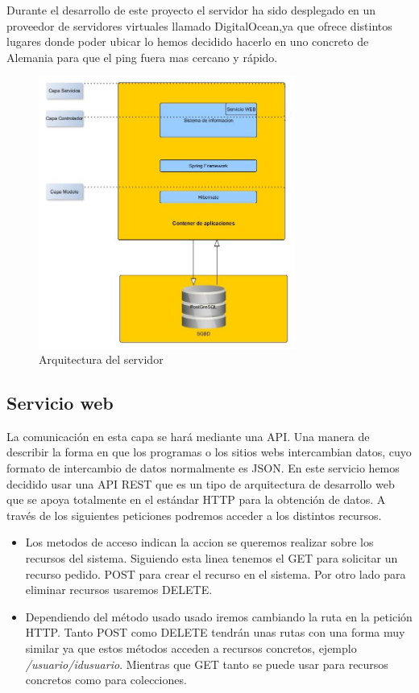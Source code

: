 Durante el desarrollo  de este proyecto el servidor ha sido desplegado en un proveedor de servidores virtuales llamado 
  DigitalOcean,ya que ofrece distintos lugares donde poder ubicar lo hemos decidido hacerlo en uno concreto de Alemania para que el ping fuera mas cercano y rápido.
\begin{figure}[H]
		\centering
		\includegraphics[width=0.75\textwidth] {arquitectura-servidor.jpg}
		\caption{Arquitectura del servidor }
	\end{figure}


\subsection{Servicio web}
 La comunicación en esta capa se hará mediante una API. Una manera de describir la forma en que los programas o los sitios webs intercambian datos, cuyo formato  de intercambio de datos normalmente es JSON. En este servicio hemos decidido usar una API REST que es un tipo de arquitectura de desarrollo web que se apoya totalmente en el estándar HTTP para la obtención de datos. A través de los siguientes peticiones podremos acceder a los distintos recursos.
 

\begin{itemize}
\item Los metodos de acceso indican la accion se queremos realizar sobre los recursos del sistema. Siguiendo esta linea tenemos el GET para solicitar un recurso pedido.  POST para crear el recurso en el sistema. Por otro lado para eliminar recursos usaremos DELETE. 



\item Dependiendo del método usado usado iremos cambiando la ruta en la petición HTTP. Tanto POST como DELETE tendrán unas rutas con una forma muy similar ya que estos métodos acceden a recursos concretos, ejemplo\textit{ /usuario/{idusuario}}. Mientras que GET tanto se puede usar para recursos concretos como para colecciones.



 


\end{itemize}

